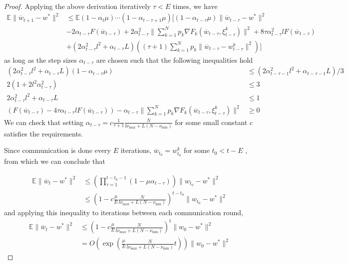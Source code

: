 \begin{proof}
	Applying the above derivation iteratively $\tau<E$ times, we have
	\begin{align*}
	\mathbb{E}\|\overline{w}_{t+1}-w^{\ast}\|^{2} & \leq\mathbb{E}(1-\alpha_{t}\mu)\cdots(1-\alpha_{t-\tau+1}\mu)[(1-\alpha_{t-\tau}\mu)\|\overline{w}_{t-\tau}-w^{\ast}\|^{2}\\
	& -2\alpha_{t-\tau}F(\overline{w}_{t-\tau})+2\alpha_{t-\tau}^{2}\|\sum_{k=1}^{N}p_{k}\nabla F_{k}(\overline{w}_{t-\tau},\xi_{t-\tau}^{k})\|^{2}+8\tau\alpha_{t-\tau}^{2}lF(\overline{w}_{t-\tau})\\
	& +(2\alpha_{t-\tau}^{2}l^{2}+\alpha_{t-\tau}L)((\tau+1)\sum_{k=1}^{N}p_{k}\|\overline{w}_{t-\tau}-w_{t-\tau}^{k}\|^{2})]
	\end{align*}
	as long as the step sizes $\alpha_{t-\tau}$ are chosen such that
	the following inequalities hold 
	\begin{align*}
	(2\alpha_{t-\tau}^{2}l^{2}+\alpha_{t-\tau}L)(1-\alpha_{t-\tau}\mu) & \leq(2\alpha_{t-\tau-1}^{2}l^{2}+\alpha_{t-\tau-1}L)/3\\
	2(1+2l^{2}\alpha_{t-\tau}^{2}) & \leq3\\
	2\alpha_{t-\tau}^{2}l^{2}+\alpha_{t-\tau}L & \leq1\\
	(F(\overline{w}_{t-\tau})-4\tau\alpha_{t-\tau}lF(\overline{w}_{t-\tau}))-\alpha_{t-\tau}\|\sum_{k=1}^{N}p_{k}\nabla F_{k}(\overline{w}_{t-\tau},\xi_{t-\tau}^{k})\|^{2} & \geq0
	\end{align*}
	We can check that setting $\alpha_{t-\tau}=c\frac{1}{\tau+1}\frac{N}{l\nu_{\max}+L(N-\nu_{\min})}$
	for some small constant $c$ satisfies the requirements. 
	
	Since communication is done every $E$ iterations, $\overline{w}_{t_{0}}=w_{t_{0}}^{k}$
	for some $t_{0}<t-E$ , from which we can conclude that 
	
	\begin{align*}
	\mathbb{E}\|\overline{w}_{t}-w^{\ast}\|^{2} & \leq(\prod_{\tau=1}^{t-t_{0}-1}(1-\mu\alpha_{t-\tau}))\|w_{t_{0}}-w^{\ast}\|^{2}\\
	& \leq(1-c\frac{\mu}{E}\frac{N}{l\nu_{\max}+L(N-\nu_{\min})})^{t-t_{0}}\|w_{t_{0}}-w^{\ast}\|^{2}
	\end{align*}
	and applying this inequality to iterations between each communication
	round, 
	\begin{align*}
	\mathbb{E}\|\overline{w}_{t}-w^{\ast}\|^{2} & \leq(1-c\frac{\mu}{E}\frac{N}{l\nu_{\max}+L(N-\nu_{\min})})^{t}\|w_{0}-w^{\ast}\|^{2}\\
	& =O(\exp(\frac{\mu}{E}\frac{N}{l\nu_{\max}+L(N-\nu_{\min})}t))\|w_{0}-w^{\ast}\|^{2}
	\end{align*}
	

\end{proof}
